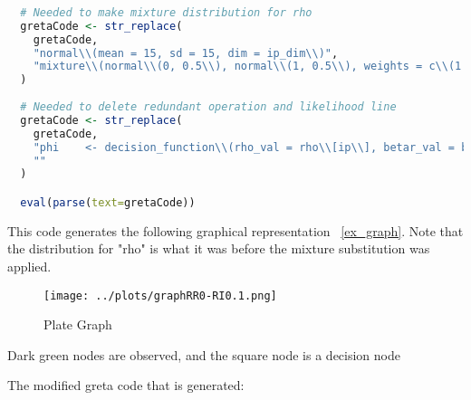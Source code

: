 \documentclass[a4paper, 11pt]{report}
\begin{document}
\begin{lstlisting}[language=R]
  
  # Needed to make mixture distribution for rho
  gretaCode <- str_replace(
    gretaCode,
    "normal\\(mean = 15, sd = 15, dim = ip_dim\\)", 
    "mixture\\(normal\\(0, 0.5\\), normal\\(1, 0.5\\), weights = c\\(1 - alpha, alpha\\), dim = ip_dim\\)"
  )
  
  # Needed to delete redundant operation and likelihood line
  gretaCode <- str_replace(
    gretaCode,
    "phi    <- decision_function\\(rho_val = rho\\[ip\\], betar_val = betar, er_val = epsilon_reddit\\[tp\\], em_val = epsilon_main\\[tp\\], theta_val = theta\\[ip\\]\\)", 
    ""
  )

  eval(parse(text=gretaCode))
\end{lstlisting}
This code generates the following graphical representation ~\autoref{ex_graph}. Note that the distribution for "rho" is what it was before the mixture substitution was applied.
\begin{figure}[h!]
	\caption{Plate Graph}
	\label{ex_graph}
	\texttt{[image: ../plots/graphRR0-RI0.1.png]}
\end{figure}

\noindent Dark green nodes are observed, and the square node is a decision node

\noindent The modified greta code that is generated:
\end{document}

